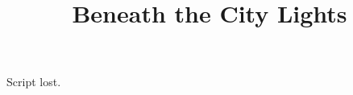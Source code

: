\documentclass[11pt]{article}
\begin{document}
\ttfamily
\title{Beneath the City Lights}
\maketitle
Script lost. 
\end{document}
